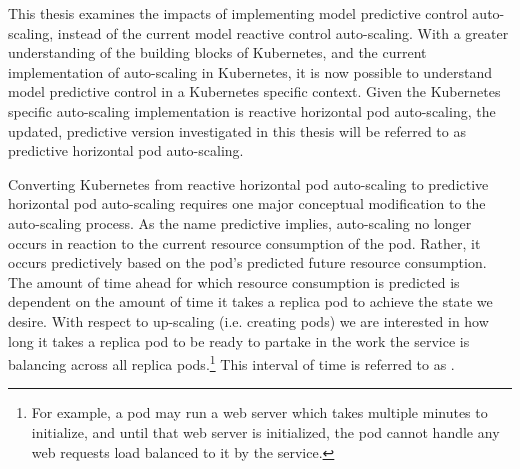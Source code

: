 This thesis examines the impacts of
implementing model predictive control auto-scaling, instead of the current model reactive
control auto-scaling. With a greater understanding of the building blocks of
Kubernetes, and the current implementation of auto-scaling in Kubernetes, it is
now possible to understand model predictive control in a Kubernetes specific
context. Given the Kubernetes specific auto-scaling implementation is reactive horizontal
pod auto-scaling, the updated, predictive version investigated in this thesis
will be referred to as predictive horizontal pod auto-scaling.

Converting Kubernetes from reactive horizontal pod auto-scaling to predictive
horizontal pod auto-scaling requires one major conceptual modification to the
auto-scaling process. As the name predictive implies, auto-scaling no longer
occurs in reaction to the current resource consumption of the pod. Rather, it occurs
predictively based on the pod's predicted future resource consumption. The
amount of time ahead for which resource consumption is predicted is dependent on
the amount of time it takes a replica pod to achieve the state we desire. With
respect to up-scaling (i.e. creating pods) we are interested in how long it
takes a replica pod to be ready to partake in the work the
service is balancing across all replica pods.\footnote{For example, a pod may
run a web server which takes multiple minutes to initialize, and until that web server
is initialized, the pod cannot handle any web requests load balanced to it by
the service.} This interval of time is referred to as .

